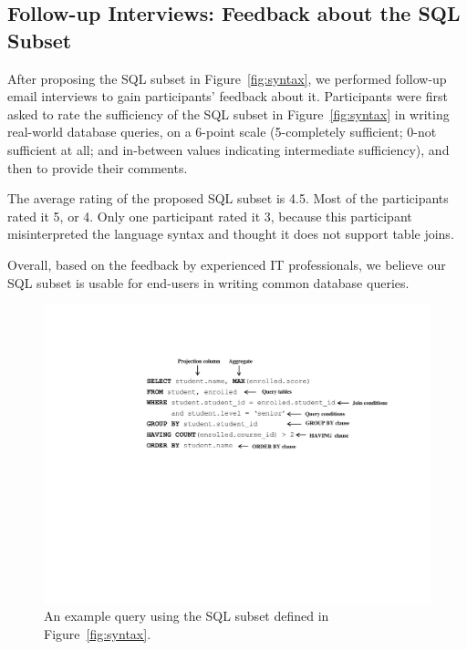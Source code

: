 





\subsection{Follow-up Interviews: Feedback about the SQL Subset}
\label{sec:interview}

After proposing the SQL subset in Figure~\ref{fig:syntax},
we performed follow-up email interviews to gain
participants' feedback about it. Participants were first asked to rate
the sufficiency of the SQL subset in Figure~\ref{fig:syntax}
in writing real-world database queries,
on a 6-point scale (5-completely
sufficient; 0-not sufficient at all;
and in-between values indicating intermediate sufficiency),
and then to provide their comments.

The average rating of the proposed SQL subset is 4.5. Most of
the participants rated it 5, or 4. Only one participant rated
it 3, because this participant misinterpreted the language
syntax and thought it does not support table joins.

Overall, based on the feedback by experienced IT professionals,
we believe our SQL subset is usable
for end-users in writing common database queries.

\begin{figure}[t]
  \centering
  \includegraphics[scale=0.52]{queryex}
  \vspace*{-5.3ex}\caption {{\label{fig:queryex}
  An example query using the SQL subset defined in Figure~\ref{fig:syntax}.
}}
\end{figure}
